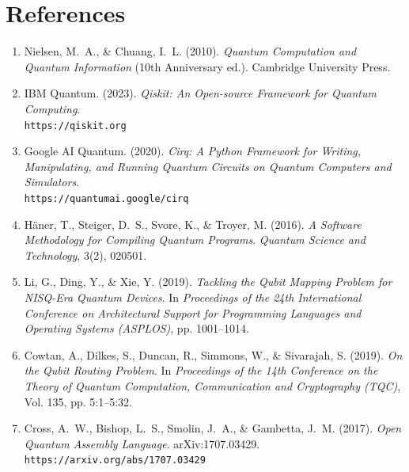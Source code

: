 \chapter*{References}

\begin{enumerate}

\item Nielsen, M.~A., \& Chuang, I.~L. (2010). \textit{Quantum Computation and Quantum Information} (10th Anniversary ed.). Cambridge University Press.

\item IBM Quantum. (2023). \textit{Qiskit: An Open-source Framework for Quantum Computing}. \\ \texttt{https://qiskit.org}

\item Google AI Quantum. (2020). \textit{Cirq: A Python Framework for Writing, Manipulating, and Running Quantum Circuits on Quantum Computers and Simulators}. \\ \texttt{https://quantumai.google/cirq}

\item Häner, T., Steiger, D.~S., Svore, K., \& Troyer, M. (2016). \textit{A Software Methodology for Compiling Quantum Programs}. \textit{Quantum Science and Technology}, 3(2), 020501.

\item Li, G., Ding, Y., \& Xie, Y. (2019). \textit{Tackling the Qubit Mapping Problem for NISQ-Era Quantum Devices}. In \textit{Proceedings of the 24th International Conference on Architectural Support for Programming Languages and Operating Systems (ASPLOS)}, pp. 1001–1014.

\item Cowtan, A., Dilkes, S., Duncan, R., Simmons, W., \& Sivarajah, S. (2019). \textit{On the Qubit Routing Problem}. In \textit{Proceedings of the 14th Conference on the Theory of Quantum Computation, Communication and Cryptography (TQC)}, Vol. 135, pp. 5:1–5:32.

\item Cross, A.~W., Bishop, L.~S., Smolin, J.~A., \& Gambetta, J.~M. (2017). \textit{Open Quantum Assembly Language}. arXiv:1707.03429. \\ \texttt{https://arxiv.org/abs/1707.03429}


\end{enumerate}
